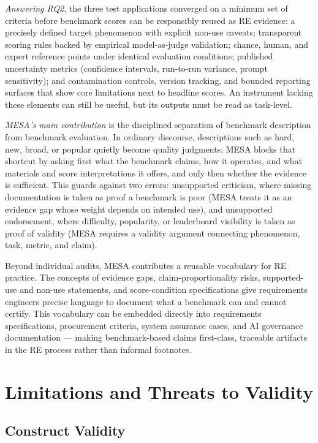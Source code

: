 \documentclass[conference]{IEEEtran}
\begin{document}
    \emph{Answering RQ2}, the three test applications converged on a minimum set of criteria before benchmark scores can be responsibly reused as RE evidence: a precisely defined target phenomenon with explicit non-use caveats; transparent scoring rules backed by empirical model-as-judge validation; chance, human, and expert reference points under identical evaluation conditions; published uncertainty metrics (confidence intervals, run-to-run variance, prompt sensitivity); and contamination controls, version tracking, and bounded reporting surfaces that show core limitations next to headline scores. An instrument lacking these elements can still be useful, but its outputs must be read as task-level.
    
    \emph{MESA's main contribution} is the disciplined separation of benchmark description from benchmark evaluation. In ordinary discourse, descriptions such as hard, new, broad, or popular quietly become quality judgments; MESA blocks that shortcut by asking first what the benchmark claims, how it operates, and what materials and score interpretations it offers, and only then whether the evidence is sufficient. This guards against two errors: unsupported criticism, where missing documentation is taken as proof a benchmark is poor (MESA treats it as an evidence gap whose weight depends on intended use), and unsupported endorsement, where difficulty, popularity, or leaderboard visibility is taken as proof of validity (MESA requires a validity argument connecting phenomenon, task, metric, and claim).
    
    Beyond individual audits, MESA contributes a reusable vocabulary for RE practice. The concepts of evidence gaps, claim-proportionality risks, supported-use and non-use statements, and score-condition specifications give requirements engineers precise language to document what a benchmark can and cannot certify. This vocabulary can be embedded directly into requirements specifications, procurement criteria, system assurance cases, and AI governance documentation — making benchmark-based claims first-class, traceable artifacts in the RE process rather than informal footnotes.

\section{Limitations and Threats to Validity}
\label{sec:threats}
\label{sec:limitations}

    \subsection{Construct Validity}
\end{document}
